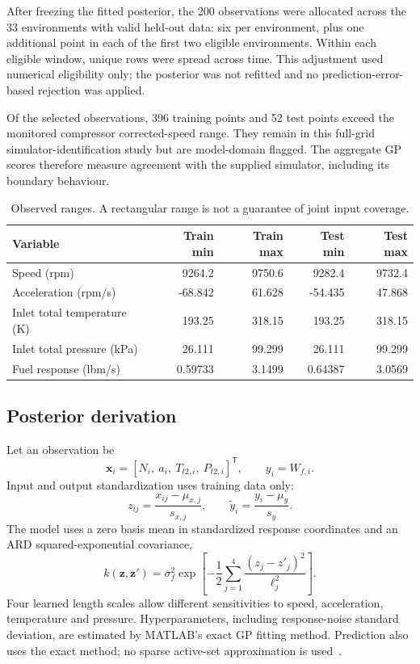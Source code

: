 \documentclass[11pt,a4paper]{article}
\begin{document}
After freezing the fitted posterior, the 200 observations were allocated across the 33 environments with valid held-out data: six per environment, plus one additional point in each of the first two eligible environments. Within each eligible window, unique rows were spread across time. This adjustment used numerical eligibility only; the posterior was not refitted and no prediction-error-based rejection was applied.

Of the selected observations, 396 training points and 52 test points exceed the monitored compressor corrected-speed range. They remain in this full-grid simulator-identification study but are model-domain flagged. The aggregate GP scores therefore measure agreement with the supplied simulator, including its boundary behaviour.

\begin{table}[H]\centering\small
\setlength{\tabcolsep}{5pt}
\begin{tabular}{@{}lrrrr@{}}\toprule
Variable & Train min & Train max & Test min & Test max\\\midrule
Speed (rpm) & 9264.2 & 9750.6 & 9282.4 & 9732.4\\
Acceleration (rpm/s) & -68.842 & 61.628 & -54.435 & 47.868\\
Inlet total temperature (K) & 193.25 & 318.15 & 193.25 & 318.15\\
Inlet total pressure (kPa) & 26.111 & 99.299 & 26.111 & 99.299\\
Fuel response (lbm/s) & 0.59733 & 3.1499 & 0.64387 & 3.0569\\
\bottomrule\end{tabular}\caption{Observed ranges. A rectangular range is not a guarantee of joint input coverage.}\end{table}


\clearpage
\subsection{Posterior derivation}
Let an observation be
\begin{equation}
\mathbf x_i=[N_i,\ a_i,\ T_{t2,i},\ P_{t2,i}]^{\mathsf T},\qquad y_i=W_{f,i}.
\end{equation}
Input and output standardization uses training data only:
\begin{equation}
z_{ij}=\frac{x_{ij}-\mu_{x,j}}{s_{x,j}},\qquad \tilde y_i=\frac{y_i-\mu_y}{s_y}.
\end{equation}
The model uses a zero basis mean in standardized response coordinates and an ARD squared-exponential covariance,
\begin{equation}
k(\mathbf z,\mathbf z')=\sigma_f^2\exp\left[-\frac12\sum_{j=1}^{4}\frac{(z_j-z'_j)^2}{\ell_j^2}\right].
\end{equation}
Four learned length scales allow different sensitivities to speed, acceleration, temperature and pressure. Hyperparameters, including response-noise standard deviation, are estimated by MATLAB's exact GP fitting method. Prediction also uses the exact method; no sparse active-set approximation is used~\cite{mathworks}.
\end{document}
